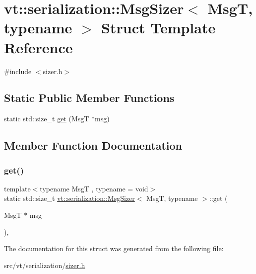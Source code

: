 \hypertarget{structvt_1_1serialization_1_1_msg_sizer}{}\section{vt\+:\+:serialization\+:\+:Msg\+Sizer$<$ MsgT, typename $>$ Struct Template Reference}
\label{structvt_1_1serialization_1_1_msg_sizer}


{\ttfamily \#include $<$sizer.\+h$>$}

\subsection*{Static Public Member Functions}
\begin{DoxyCompactItemize}
\item 
static std\+::size\+\_\+t \hyperlink{structvt_1_1serialization_1_1_msg_sizer_a22f440a462f8874a6661cb900d8d1d38}{get} (MsgT $\ast$msg)
\end{DoxyCompactItemize}


\subsection{Member Function Documentation}
\mbox{\label{structvt_1_1serialization_1_1_msg_sizer_a22f440a462f8874a6661cb900d8d1d38}} 
\subsubsection{\texorpdfstring{get()}{get()}}
{\footnotesize\ttfamily template$<$typename MsgT , typename  = void$>$ \\
static std\+::size\+\_\+t \hyperlink{structvt_1_1serialization_1_1_msg_sizer}{vt\+::serialization\+::\+Msg\+Sizer}$<$ MsgT, typename $>$\+::get (\begin{DoxyParamCaption}\item[{MsgT $\ast$}]{msg }\end{DoxyParamCaption})\hspace{0.3cm}{\ttfamily [inline]}, {\ttfamily [static]}}



The documentation for this struct was generated from the following file\+:\begin{DoxyCompactItemize}
\item 
src/vt/serialization/\hyperlink{sizer_8h}{sizer.\+h}\end{DoxyCompactItemize}
